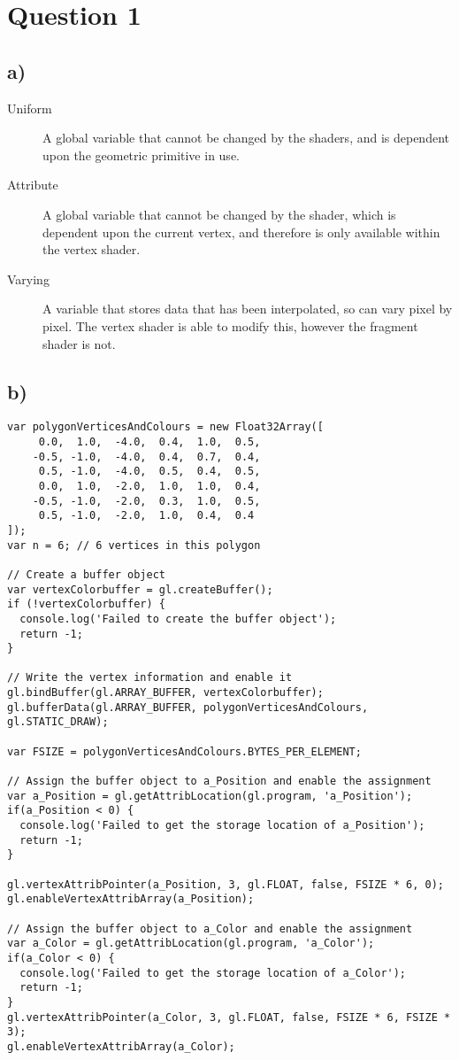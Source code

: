 \documentclass[a4paper,12pt]{article}
\begin{document}
\section*{Question 1}
\subsection*{a)}
\begin{description}
    \item[Uniform]
    A global variable that cannot be changed by the shaders, and is dependent upon the geometric primitive in use.
    \item[Attribute]
    A global variable that cannot be changed by the shader, which is dependent upon the current vertex, and therefore is only available within the vertex shader.
    \item[Varying]
    A variable that stores data that has been interpolated, so can vary pixel by pixel. The vertex shader is able to modify this, however the fragment shader is not.
\end{description}

\subsection*{b)}
\begin{lstlisting}[title=Colour and vertices in same array]
var polygonVerticesAndColours = new Float32Array([
     0.0,  1.0,  -4.0,  0.4,  1.0,  0.5,
    -0.5, -1.0,  -4.0,  0.4,  0.7,  0.4,
     0.5, -1.0,  -4.0,  0.5,  0.4,  0.5,
     0.0,  1.0,  -2.0,  1.0,  1.0,  0.4,
    -0.5, -1.0,  -2.0,  0.3,  1.0,  0.5,
     0.5, -1.0,  -2.0,  1.0,  0.4,  0.4
]);
var n = 6; // 6 vertices in this polygon

// Create a buffer object
var vertexColorbuffer = gl.createBuffer();
if (!vertexColorbuffer) {
  console.log('Failed to create the buffer object');
  return -1;
}

// Write the vertex information and enable it
gl.bindBuffer(gl.ARRAY_BUFFER, vertexColorbuffer);
gl.bufferData(gl.ARRAY_BUFFER, polygonVerticesAndColours, gl.STATIC_DRAW);

var FSIZE = polygonVerticesAndColours.BYTES_PER_ELEMENT;

// Assign the buffer object to a_Position and enable the assignment
var a_Position = gl.getAttribLocation(gl.program, 'a_Position');
if(a_Position < 0) {
  console.log('Failed to get the storage location of a_Position');
  return -1;
}

gl.vertexAttribPointer(a_Position, 3, gl.FLOAT, false, FSIZE * 6, 0);
gl.enableVertexAttribArray(a_Position);

// Assign the buffer object to a_Color and enable the assignment
var a_Color = gl.getAttribLocation(gl.program, 'a_Color');
if(a_Color < 0) {
  console.log('Failed to get the storage location of a_Color');
  return -1;
}
gl.vertexAttribPointer(a_Color, 3, gl.FLOAT, false, FSIZE * 6, FSIZE * 3);
gl.enableVertexAttribArray(a_Color);
\end{lstlisting}
\end{document}
